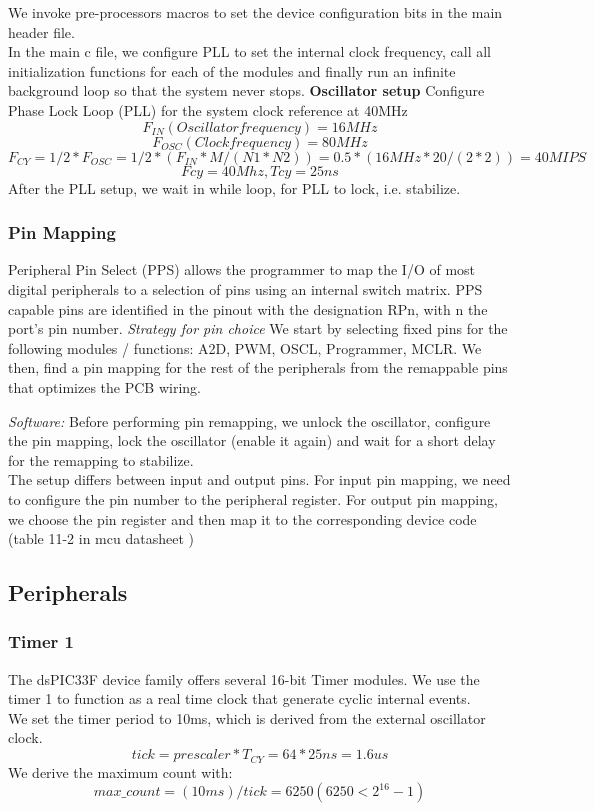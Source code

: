 We invoke pre-processors macros to set the device configuration bits in the main header file.\\
In the main c file, we configure PLL to set the internal clock frequency, call all initialization functions for each of the modules and finally run an infinite background loop so that the system never stops.
\vskip 0.2in
\noindent
\textbf{Oscillator setup}
\vskip 0.1in
\noindent
Configure Phase Lock Loop (PLL) for the system clock reference at 40MHz
	$$F_{IN} (Oscillator frequency) = 16MHz  $$
    $$F_{OSC} (Clock frequency) =  80MHz$$
 	$$F_{CY} = 1/2 * F_{OSC} = 1/2 * (F_{IN}*M/(N1*N2)) = 0.5 * (16MHz*20/(2*2)) = 40 MIPS$$
$$Fcy=40Mhz, Tcy=25ns$$
After the PLL setup, we wait in while loop, for PLL to lock, i.e. stabilize.

\subsubsection*{Pin Mapping}

Peripheral Pin Select (PPS) allows the programmer to map the I/O of most digital peripherals to a selection of pins using an internal switch matrix.
PPS capable pins are identified in the pinout with the designation RPn, with n the port’s pin number.
\vskip 0.2in
\noindent
\textit{Strategy for pin choice}
\vskip 0.1in
\noindent
We start by selecting fixed pins for the following modules / functions: A2D, PWM, OSCL, Programmer, MCLR. We then, find a pin mapping for the rest of the peripherals from the remappable pins that optimizes the PCB wiring.

\vskip 0.2in
\noindent
\textit{Software:}
\vskip 0.1in
\noindent
Before performing pin remapping, we unlock the oscillator, configure the pin mapping, lock the oscillator (enable it again) and wait for a short delay for the remapping to stabilize.\\
The setup differs between input and output pins. For input pin mapping, we need to configure the pin number to the peripheral register. For output pin mapping, we choose the pin register and then map it to the corresponding device code (table 11-2 in mcu datasheet \cite{mcu})

\subsection{Peripherals}
\subsubsection*{Timer 1}
The dsPIC33F device family offers several 16-bit Timer modules. We use the timer 1 to function as a real time clock that generate cyclic internal events.\\
We set the timer period to 10ms, which is derived from the external oscillator clock.
$$tick=prescaler*T_{CY}= 64*25ns= 1.6us $$
We derive the maximum count with:
$$max\_count=(10 ms)/tick=6250 (6250<2^{16}-1)$$

